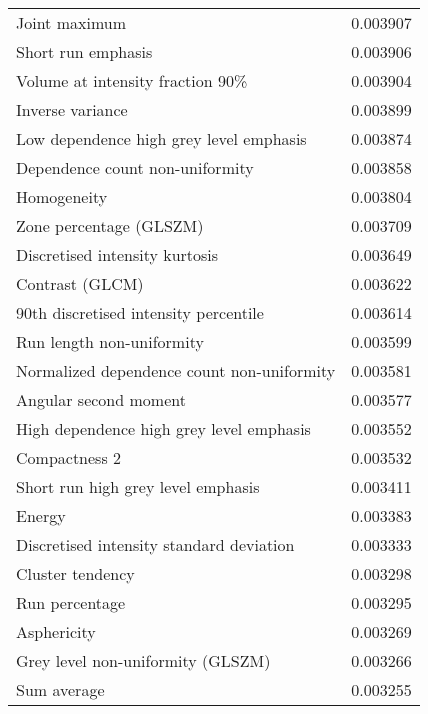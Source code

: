 \begin{longtable}{|lr|}
Joint maximum                                      &        0.003907 \\
Short run emphasis                                 &        0.003906 \\
Volume at intensity fraction 90\%                   &        0.003904 \\
Inverse variance                                   &        0.003899 \\
Low dependence high grey level emphasis            &        0.003874 \\
Dependence count non-uniformity                    &        0.003858 \\
Homogeneity                                        &        0.003804 \\
Zone percentage (GLSZM)                            &        0.003709 \\
Discretised intensity kurtosis                     &        0.003649 \\
Contrast (GLCM)                                    &        0.003622 \\
90th discretised intensity percentile              &        0.003614 \\
Run length non-uniformity                          &        0.003599 \\
Normalized dependence count non-uniformity         &        0.003581 \\
Angular second moment                              &        0.003577 \\
High dependence high grey level emphasis           &        0.003552 \\
Compactness 2                                      &        0.003532 \\
Short run high grey level emphasis                 &        0.003411 \\
Energy                                             &        0.003383 \\
Discretised intensity standard deviation           &        0.003333 \\
Cluster tendency                                   &        0.003298 \\
Run percentage                                     &        0.003295 \\
Asphericity                                        &        0.003269 \\
Grey level non-uniformity (GLSZM)                  &        0.003266 \\
Sum average                                        &        0.003255 \\

\end{longtable}
